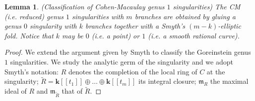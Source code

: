 \documentclass[11pt]{amsart}
\renewcommand{\k}{\mathbf k}
\theoremstyle{plain}
\newtheorem{lem}[thm]{Lemma}
\theoremstyle{definition}
\begin{document}
\begin{lem}(Classification of Cohen-Macaulay genus $1$ singularities)
The CM (i.e. reduced) genus $1$ singularities with $m$ branches are obtained by gluing a genus $0$ singularity with $k$ branches together with a Smyth's $(m-k)$-elliptic fold.
Notice that $k$ may be $0$ (i.e. a point) or $1$ (i.e. a smooth rational curve).
\end{lem}
\begin{proof}
We extend the argument given by Smyth \cite[Appendix~A]{SMY1} to classify the Goreinstein genus $1$ singularities. We study the analytic germ of the singularity and we adopt Smyth's notation: $R$ denotes the completion of the local ring of $C$ at the singularity; 
$\widetilde{R}=\k[[t_1]]\oplus\ldots\oplus \k[[t_m]]$ its integral closure; $\mathfrak{m}_R$ the maximal ideal of $R$  and $\mathfrak{m}_{\widetilde{R}}$ that of $\widetilde{R}.$


\end{proof}
\end{document}
